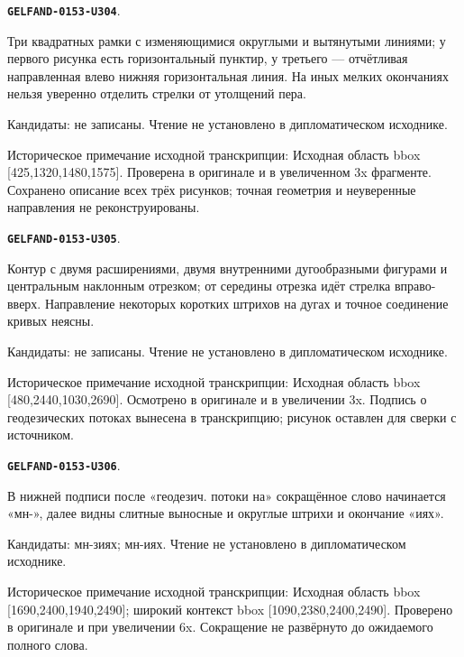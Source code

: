 \documentclass[11pt]{article}
\theoremstyle{definition}
\theoremstyle{remark}
\begin{document}
\par\noindent\leavevmode{}\label{GELFAND-0153-U304}\label{GELFAND-P001408:baker-sequence:note}\textbf{\texttt{GELFAND-0153-U304}}.\nopagebreak[4]\par
Три квадратных рамки с изменяющимися округлыми и вытянутыми линиями; у первого рисунка есть горизонтальный пунктир, у третьего — отчётливая направленная влево нижняя горизонтальная линия. На иных мелких окончаниях нельзя уверенно отделить стрелки от утолщений пера.\par
Кандидаты: не записаны. Чтение не установлено в дипломатическом исходнике.\par
Историческое примечание исходной транскрипции: Исходная область bbox [425,1320,1480,1575]. Проверена в оригинале и в увеличенном 3x фрагменте. Сохранено описание всех трёх рисунков; точная геометрия и неуверенные направления не реконструированы.\par\medskip
\par\noindent\leavevmode{}\label{GELFAND-0153-U305}\label{GELFAND-P001408:hyperbolic-surface:note}\textbf{\texttt{GELFAND-0153-U305}}.\nopagebreak[4]\par
Контур с двумя расширениями, двумя внутренними дугообразными фигурами и центральным наклонным отрезком; от середины отрезка идёт стрелка вправо-вверх. Направление некоторых коротких штрихов на дугах и точное соединение кривых неясны.\par
Кандидаты: не записаны. Чтение не установлено в дипломатическом исходнике.\par
Историческое примечание исходной транскрипции: Исходная область bbox [480,2440,1030,2690]. Осмотрено в оригинале и в увеличении 3x. Подпись о геодезических потоках вынесена в транскрипцию; рисунок оставлен для сверки с источником.\par\medskip
\par\noindent\leavevmode{}\label{GELFAND-0153-U306}\label{GELFAND-P001408:manifold-abbreviation:note}\textbf{\texttt{GELFAND-0153-U306}}.\nopagebreak[4]\par
В нижней подписи после «геодезич. потоки на» сокращённое слово начинается «мн-», далее видны слитные выносные и округлые штрихи и окончание «иях».\par
Кандидаты: мн-зиях; мн-иях. Чтение не установлено в дипломатическом исходнике.\par
Историческое примечание исходной транскрипции: Исходная область bbox [1690,2400,1940,2490]; широкий контекст bbox [1090,2380,2400,2490]. Проверено в оригинале и при увеличении 6x. Сокращение не развёрнуто до ожидаемого полного слова.\par\medskip
\end{document}
